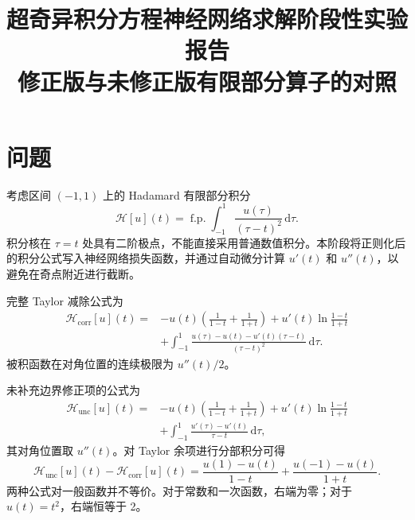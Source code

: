 \documentclass[UTF8,fontset=none,11pt,a4paper]{ctexart}
\title{\bfseries 超奇异积分方程神经网络求解阶段性实验报告\\[0.45em]
\large 修正版与未修正版有限部分算子的对照}
\newcommand{\Hcorr}{\mathcal H_{\mathrm{corr}}}
\newcommand{\Hunc}{\mathcal H_{\mathrm{unc}}}
\begin{document}
\maketitle


\section{问题}

考虑区间 $(-1,1)$ 上的 Hadamard 有限部分积分
\begin{equation}
\mathcal H[u](t)=\operatorname{f.p.}\!\int_{-1}^{1}
\frac{u(\tau)}{(\tau-t)^2}\,\mathrm d\tau .
\end{equation}
积分核在 $\tau=t$ 处具有二阶极点，不能直接采用普通数值积分。本阶段将正则化后的积分公式写入神经网络损失函数，并通过自动微分计算 $u'(t)$ 和 $u''(t)$，以避免在奇点附近进行截断。

完整 Taylor 减除公式为
\begin{align}
\Hcorr[u](t)
={}&-u(t)\left(\frac{1}{1-t}+\frac{1}{1+t}\right)
+u'(t)\ln\frac{1-t}{1+t}\nonumber\\
&+\int_{-1}^{1}
\frac{u(\tau)-u(t)-u'(t)(\tau-t)}{(\tau-t)^2}\,\mathrm d\tau .
\end{align}
被积函数在对角位置的连续极限为 $u''(t)/2$。

未补充边界修正项的公式为
\begin{align}
\Hunc[u](t)
={}&-u(t)\left(\frac{1}{1-t}+\frac{1}{1+t}\right)
+u'(t)\ln\frac{1-t}{1+t}\nonumber\\
&+\int_{-1}^{1}\frac{u'(\tau)-u'(t)}{\tau-t}\,\mathrm d\tau ,
\end{align}
其对角位置取 $u''(t)$。对 Taylor 余项进行分部积分可得
\begin{equation}
\Hunc[u](t)-\Hcorr[u](t)=
\frac{u(1)-u(t)}{1-t}+\frac{u(-1)-u(t)}{1+t}.
\end{equation}
两种公式对一般函数并不等价。对于常数和一次函数，右端为零；对于 $u(t)=t^2$，右端恒等于 2。
\end{document}
